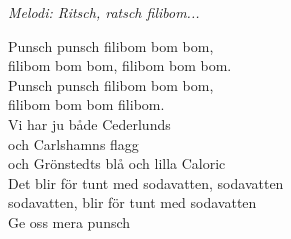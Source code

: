 {\footnotesize\textit{Melodi: Ritsch, ratsch filibom...}}\par
\vspace{10pt}
Punsch punsch filibom bom bom,\\
filibom bom bom, filibom bom bom. \\
Punsch punsch filibom bom bom,\\
filibom bom bom filibom.\\
Vi har ju både Cederlunds \\
och Carlshamns flagg\\
och Grönstedts blå och lilla Caloric\\
Det blir för tunt med sodavatten, sodavatten\\
sodavatten, blir för tunt med sodavatten\\
Ge oss mera punsch
